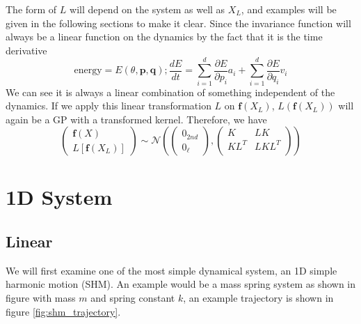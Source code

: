 \documentclass{statsmsc}
\begin{document}
The form of $L$ will depend on the system as well as $X_L$, and examples will be given in the following sections to make it clear.
Since the invariance function will always be a linear function on the dynamics by the fact that it is the time derivative
$$
\text{energy}=E(\theta, \mathbf{p}, \mathbf{q});  \frac{dE}{dt}= \sum_{i=1}^d \frac{\partial E}{\partial p_i} a_i + \sum_{i=1}^d\frac{\partial E}{\partial q_i} v_i
$$
We can see it is always a linear combination of something independent of the dynamics.
If we apply this linear transformation $L$ on $\mathbf{f}(X_L)$, $L(\mathbf{f}(X_L))$ will again be a GP with a transformed kernel.
Therefore, we have 
$$\begin{pmatrix}
\mathbf{f}(X)\\L[\mathbf{f}(X_L)]
\end{pmatrix}
\sim\mathcal{N}
\left(\begin{pmatrix}0_{2nd}\\0_{\ell}\end{pmatrix}, \begin{pmatrix}
    K & LK \\
    KL^T & LKL^T\\
\end{pmatrix}\right)
$$

\section{1D System}
\subsection{Linear}
We will first examine one of the most simple dynamical system, an 1D simple harmonic motion (SHM). 
An example would be a mass spring system as shown in figure with mass $m$ and spring constant $k$, an example trajectory is shown in figure \ref{fig:shm_trajectory}. 

\begin{figure}[H]
    \centering
{}
\end{figure}
\end{document}

